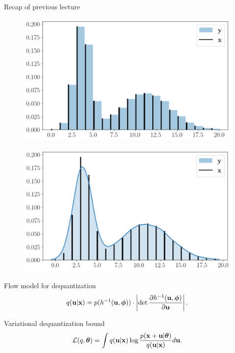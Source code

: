 \begin{frame}{Recap of previous lecture}
	
	\begin{minipage}[t]{0.5\columnwidth}
		\begin{figure}
			\centering
			\includegraphics[width=1.0\linewidth]{figs/uniform_dequantization.png}
		\end{figure}
	\end{minipage}%
	\begin{minipage}[t]{0.5\columnwidth}
		\begin{figure}
			\centering
			\includegraphics[width=1.0\linewidth]{figs/variational_dequantization.png}
		\end{figure}
	\end{minipage}
	\begin{block}{Flow model for dequantization}
	\vspace{-0.3cm}
	\[
	q(\mathbf{u} | \mathbf{x}) = p(h^{-1}(\mathbf{u}, \boldsymbol{\phi})) \cdot \left| \det \frac{\partial h^{-1}(\mathbf{u}, \boldsymbol{\phi})}{\partial \mathbf{u}}\right|.
	\]
	\vspace{-0.3cm}
	\end{block}
	\begin{block}{Variational dequantization bound}
		\[
		\mathcal{L}(q, \boldsymbol{\theta}) = \int q(\mathbf{u} | \mathbf{x}) \log \frac{p(\mathbf{x} + \mathbf{u} | \boldsymbol{\theta})}{q(\mathbf{u} | \mathbf{x})} d \mathbf{u}.
		\]
	\end{block}
\end{frame}
